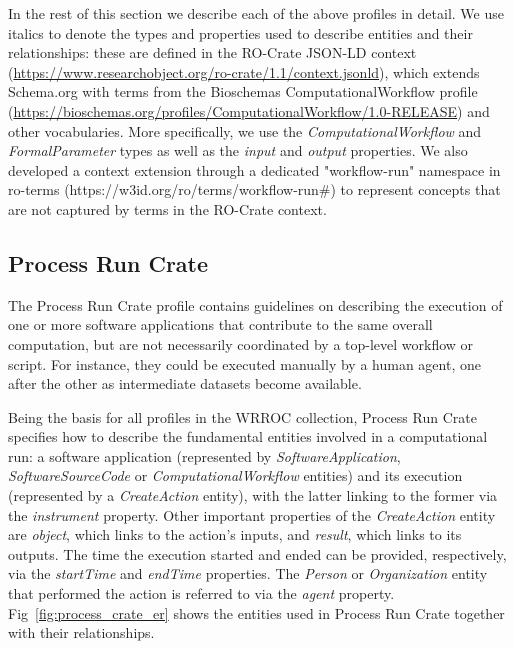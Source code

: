 \documentclass[10pt,letterpaper]{article}
\begin{document}
In the rest of this section we describe each of the above profiles in detail.
We use italics to denote the types and properties used to describe entities and their relationships: these are defined in the RO-Crate JSON-LD context (\url{https://www.researchobject.org/ro-crate/1.1/context.jsonld}), which extends Schema.org with terms from the Bioschemas \cite{Gray 2017} ComputationalWorkflow profile (\url{https://bioschemas.org/profiles/ComputationalWorkflow/1.0-RELEASE}) and other vocabularies. More specifically, we use the \emph{ComputationalWorkflow} and \emph{FormalParameter} types as well as the \emph{input} and \emph{output} properties. We also developed a context extension through a dedicated "workflow-run" namespace in ro-terms (https://w3id.org/ro/terms/workflow-run#) to represent concepts that are not captured by terms in the RO-Crate context.

\subsection{Process Run Crate}\label{process-run-crate}

The Process Run Crate profile contains guidelines on describing the execution of one or more software applications that contribute to the same overall computation, but are not necessarily coordinated by a top-level workflow or script.
For instance, they could be executed manually by a human agent, one after the other as intermediate datasets become available.

Being the basis for all profiles in the WRROC collection, Process Run Crate specifies how to describe the fundamental entities involved in a computational run: a software application (represented by
\emph{SoftwareApplication}, \emph{SoftwareSourceCode} or
\emph{ComputationalWorkflow} entities) and its execution (represented by a \emph{CreateAction} entity), with the latter linking to the former via the \emph{instrument} property.
Other important properties of the
\emph{CreateAction} entity are \emph{object}, which links to the action's inputs, and \emph{result}, which links to its outputs.
The time the execution started and ended can be provided, respectively, via the
\emph{startTime} and \emph{endTime} properties.
The \emph{Person} or
\emph{Organization} entity that performed the action is referred to via the \emph{agent} property.
Fig~\ref{fig:process_crate_er} shows the entities used in Process Run Crate together with their relationships.
\end{document}
